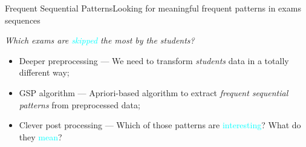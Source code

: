 \begin{frame}{Frequent Sequential Patterns}{Looking for meaningful frequent patterns in exams sequences}

     \vspace{0,1cm}\centering\textit{Which exams are \textcolor{cyan}{skipped} the most by the students?} \vspace{0,4cm}

\begin{block}{}
		\begin{itemize}
			\item<1-> \alert{Deeper preprocessing} --- We need to transform \emph{students} data in a totally different way;\vspace{0.2cm}
			\item<2-> \alert{GSP algorithm} --- Apriori-based algorithm to extract \emph{frequent sequential patterns} from preprocessed data;\vspace{0.2cm}
			\item<3-> \alert{Clever post processing} --- Which of those patterns are \textcolor{cyan}{interesting}? What do they \textcolor{cyan}{mean}?\vspace{0.2cm}
		\end{itemize}
	\end{block}

\end{frame}

